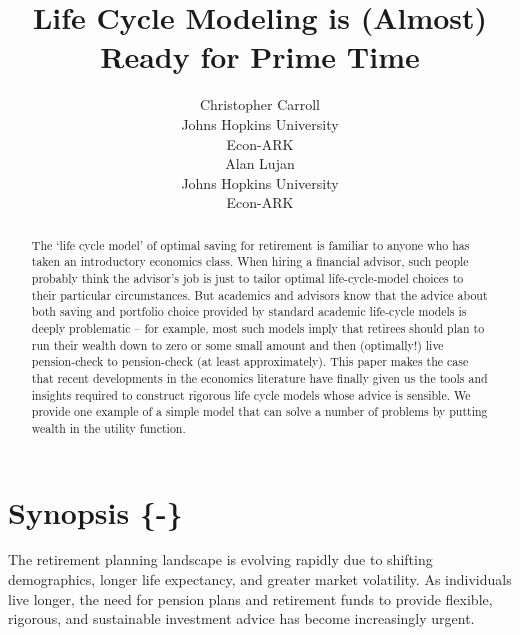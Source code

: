 \documentclass{article}
\title{Life Cycle Modeling is (Almost) \\ Ready for Prime Time}
\date{\displaydate{articleDate}}
\author{Christopher Carroll\footnotemark[1]\\
Johns Hopkins University\\Econ-ARK\\\AND
Alan Lujan\\
Johns Hopkins University\\Econ-ARK\\}
\begin{document}
\maketitle
{}

\begin{abstract}
The `life cycle model' of optimal saving for retirement is familiar to anyone who has taken an introductory economics class.
When hiring a financial advisor, such people probably think the advisor's job is just to tailor optimal life-cycle-model choices to their particular circumstances.
But academics and advisors know that the advice about both saving and portfolio choice provided by standard academic life-cycle models is deeply problematic -- for example, most such models imply that retirees should plan to run their wealth down to zero or some small amount and then (optimally!) live pension-check to pension-check (at least approximately).
This paper makes the case that recent developments in the economics literature have finally given us the tools and insights required to construct rigorous life cycle models whose advice is sensible.
We provide one example of a simple model that can solve a number of problems by putting wealth in the utility function.
\end{abstract}

\keywords{}


\section{Synopsis \{-\}}

The retirement planning landscape is evolving rapidly due to shifting demographics, longer life expectancy, and greater market volatility. As individuals live longer, the need for pension plans and retirement funds to provide flexible, rigorous, and sustainable investment advice has become increasingly urgent.
\end{document}
